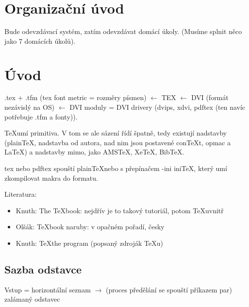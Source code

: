 \documentclass[12pt]{article}					%
\begin{document}
\section*{Organizační úvod}
    Bude odevzdávací systém, zatím odevzdávat domácí úkoly. (Musíme splnit něco jako 7 domácích úkolů).

\section{Úvod}
    .tex + .tfm (tex font metric = rozměry písmen) $\leftarrow$ TEX $\leftarrow$ DVI (formát nezávislý na OS) $\leftarrow$ DVI moduly = DVI drivery (dvips, xdvi, pdftex (ten navíc potřebuje .tfm a fonty)).

    \TeX umí primitiva. V tom se ale sázení řídí špatně, tedy existují nadstavby (plain\TeX, nadstavba od autora, nad nim jsou postavené con\TeX t, opmac a \LaTeX) a nadstavby mimo, jako AMS\TeX, Xe\TeX, Bib\TeX.

    tex nebo pdftex spouští plain\TeX nebo s přepínačem -ini ini\TeX, který umí zkompilovat makra do formatu.

    Literatura:
    \begin{itemize}
        \item Knuth: The \TeX book: nejdřív je to takový tutoriál, potom \TeX uvnitř
        \item Olšák: \TeX book naruby: v opačném pořadí, česky
        \item Knuth: \TeX the program (popsaný zdroják \TeX u)
    \end{itemize}

    \subsection{Sazba odstavce}
        Vstup = horizontální seznam $\rightarrow$ (proces předělání se spouští příkazem par) zalámaný odstavec
\end{document}
